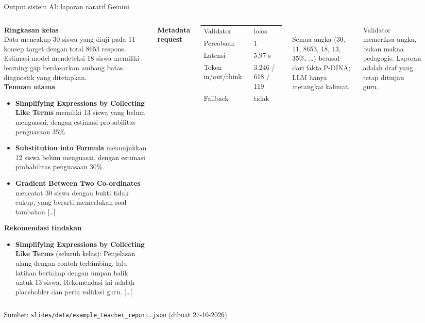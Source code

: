 \documentclass[aspectratio=169,10pt]{beamer}
\newcommand{\src}[1]{\par\vfill{\tiny\color{midgray}Sumber: #1}}
\begin{document}
\begin{frame}{Output sistem AI: laporan naratif Gemini}
  \begin{columns}[T]
    \begin{tcolorbox}[colback=white, colframe=accent, boxrule=0.5pt, arc=2pt, left=5pt, right=5pt, top=3pt, bottom=3pt,
                      fontupper=\scriptsize, title={\scriptsize Laporan guru -- dihasilkan \texttt{gemini-3.1-flash-lite} (dipotong)},
                      coltitle=white, colbacktitle=accent]
      \textbf{Ringkasan kelas}\\
      Data mencakup 30 siswa yang diuji pada 11 konsep target dengan total 8653 respons. Estimasi model mendeteksi
      18 siswa memiliki learning gap berdasarkan ambang batas diagnostik yang ditetapkan.\\[3pt]
      \textbf{Temuan utama}
      \begin{itemize}
        \item \textbf{Simplifying Expressions by Collecting Like Terms} memiliki 13 siswa yang belum menguasai, dengan
              estimasi probabilitas penguasaan 35\%.
        \item \textbf{Substitution into Formula} menunjukkan 12 siswa belum menguasai, dengan estimasi probabilitas
              penguasaan 30\%.
        \item \textbf{Gradient Between Two Co-ordinates} mencatat 30 siswa dengan bukti tidak cukup, yang berarti
              memerlukan soal tambahan [\dots]
      \end{itemize}
      \textbf{Rekomendasi tindakan}
      \begin{itemize}
        \item \textbf{Simplifying Expressions by Collecting Like Terms} (seluruh kelas): Penjelasan ulang dengan contoh
              terbimbing, lalu latihan bertahap dengan umpan balik untuk 13 siswa. Rekomendasi ini adalah placeholder dan
              perlu validasi guru. [\dots]
      \end{itemize}
    \end{tcolorbox}
    \footnotesize
    \textbf{Metadata request}\\[3pt]
    \begin{tabular}{@{}ll@{}}
      \toprule
      Validator & lolos \\
      Percobaan & 1 \\
      Latensi & 5,97 s \\
      Token in/out/think & 3.246 / 618 / 119 \\
      Fallback & tidak \\
      \bottomrule
    \end{tabular}\\[5pt]
    Semua angka (30, 11, 8653, 18, 13, 35\%, \dots) berasal dari fakta P-DINA; LLM hanya merangkai kalimat.
    \begin{warnbox}
      Validator memeriksa angka, bukan makna pedagogis. Laporan adalah draf yang tetap ditinjau guru.
    \end{warnbox}
  \end{columns}
  \src{\texttt{slides/data/example\_teacher\_report.json} (dibuat 27-10-2026)}
\end{frame}
\end{document}
